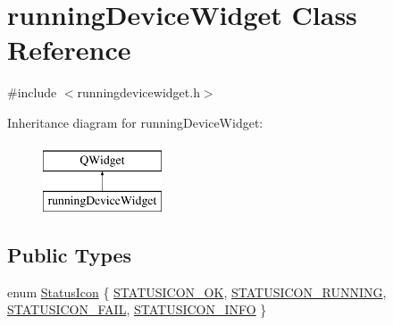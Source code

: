 \hypertarget{classrunning_device_widget}{\section{running\-Device\-Widget Class Reference}
\label{classrunning_device_widget}
}


{\ttfamily \#include $<$runningdevicewidget.\-h$>$}

Inheritance diagram for running\-Device\-Widget\-:\begin{figure}[H]
\begin{center}
\leavevmode
\includegraphics[height=2.000000cm]{classrunning_device_widget}
\end{center}
\end{figure}
\subsection*{Public Types}
\begin{DoxyCompactItemize}
\item 
enum \hyperlink{group___y_modem_uploader_ga2544534d93816d92882b9351db3e3832}{Status\-Icon} \{ \hyperlink{group___y_modem_uploader_gga2544534d93816d92882b9351db3e3832a9ee79f7fd0f08c1c300815f7dda5f034}{S\-T\-A\-T\-U\-S\-I\-C\-O\-N\-\_\-\-O\-K}, 
\hyperlink{group___y_modem_uploader_gga2544534d93816d92882b9351db3e3832a2dfa2228c471d23502656be472cfea8a}{S\-T\-A\-T\-U\-S\-I\-C\-O\-N\-\_\-\-R\-U\-N\-N\-I\-N\-G}, 
\hyperlink{group___y_modem_uploader_gga2544534d93816d92882b9351db3e3832acbb5494d2fd96bb7d0b706e0125e0089}{S\-T\-A\-T\-U\-S\-I\-C\-O\-N\-\_\-\-F\-A\-I\-L}, 
\hyperlink{group___y_modem_uploader_gga2544534d93816d92882b9351db3e3832acfa9666424709e360d9f9e7d9af00ab4}{S\-T\-A\-T\-U\-S\-I\-C\-O\-N\-\_\-\-I\-N\-F\-O}
 \}
\end{DoxyCompactItemize}
